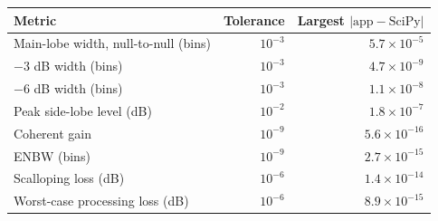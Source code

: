 \begin{tabular}{lrr}
\hline
Metric & Tolerance & Largest $|\text{app} - \text{SciPy}|$ \\
\hline
Main-lobe width, null-to-null (bins) & $10^{-3}$ & $5.7\times10^{-5}$ \\
$-3$ dB width (bins) & $10^{-3}$ & $4.7\times10^{-9}$ \\
$-6$ dB width (bins) & $10^{-3}$ & $1.1\times10^{-8}$ \\
Peak side-lobe level (dB) & $10^{-2}$ & $1.8\times10^{-7}$ \\
Coherent gain & $10^{-9}$ & $5.6\times10^{-16}$ \\
ENBW (bins) & $10^{-9}$ & $2.7\times10^{-15}$ \\
Scalloping loss (dB) & $10^{-6}$ & $1.4\times10^{-14}$ \\
Worst-case processing loss (dB) & $10^{-6}$ & $8.9\times10^{-15}$ \\
\hline
\end{tabular}

